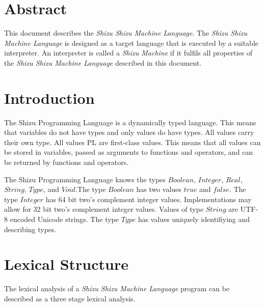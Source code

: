 \documentclass{article}
\title{\mylanguage{}}
\author{\myauthor}
\newcommand{\myproject}{Shizu}
\newcommand{\mymachine}{\myproject{} Machine}
\newcommand{\mylanguage}{\myproject{} \mymachine{} Language}
\begin{document}
\maketitle
\section{Abstract}
This document describes the \emph{\mylanguage{}}.
The \emph{\mylanguage{}} is designed as a target language that is executed by a suitable interpreter.
An interpreter is called a \emph{\mymachine{}} if it fulfils all properties of the \emph{\mylanguage{}} described in this document. 


\section{Introduction}
The \myproject{} Programming Language is a dynamically typed language. This means that variables do not have types and
only values do have types. All values carry their own type. All values PL are first-class values. This means that
all values can be stored in variables, passed as arguments to functions and operators, and can be returned by functions
and operators.

The \myproject{} Programming Language knows the types $\textit{Boolean}$, $\textit{Integer}$, $\textit{Real}$,
$\textit{String}$, $\textit{Type}$, and $\textit{Void}$.The type $\textit{Boolean}$ has two values $\textit{true}$
and $\textit{false}$. The type $\textit{Integer}$ has 64 bit two's complement integer values. Implementations may
allow for 32 bit two's complement integer values. Values of type $\textit{String}$ are UTF-8 encoded Unicode strings.
The type $\textit{Type}$ has values uniquely identifiying and describing types.

\noindent{}

\section{Lexical Structure}
\noindent{}The lexical analysis of a \emph{\mylanguage{}} program can be described as a three stage lexical analysis.
\end{document}
